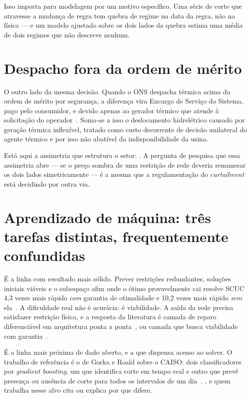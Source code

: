 \documentclass[10pt,a4paper,oneside]{book}
\begin{document}
Isso importa para modelagem por um motivo específico.  Uma série de corte que atravesse a mudança de
regra tem quebra de regime na data da regra, não na física --- e um modelo
ajustado sobre os dois lados da quebra estima uma média de dois regimes que não
descreve nenhum.

\section*{Despacho fora da ordem de mérito}

O outro lado da mesma decisão. Quando o ONS despacha térmica acima da ordem de
mérito por segurança, a diferença vira Encargo de Serviço do Sistema, pago pelo
consumidor, e devido apenas ao gerador térmico que atende à solicitação do
operador~\cite{ess}. Soma-se a isso o deslocamento hidrelétrico causado por
geração térmica inflexível, tratado como custo decorrente de decisão unilateral
do agente térmico e por isso não abatível da indisponibilidade da usina.

Está aqui a assimetria que estrutura o setor: . A pergunta de pesquisa que essa
assimetria abre --- se o preço sombra de uma restrição de rede deveria remunerar
os dois lados simetricamente --- é a mesma que a regulamentação do
\emph{curtailment} está decidindo por outra via.

\section*{Aprendizado de máquina: três tarefas distintas, frequentemente confundidas}

É a linha com resultado mais sólido. Prever restrições redundantes, soluções
iniciais viáveis e o subespaço afim onde o ótimo provavelmente cai resolve SCUC
4,3 vezes mais rápido \emph{com} garantia de otimalidade e 10,2 vezes mais
rápido \emph{sem} ela~\cite{xavier2020}. A dificuldade real não é acurácia: é
viabilidade. A saída da rede precisa satisfazer restrição física, e a resposta
da literatura é camada de reparo diferenciável em arquitetura ponta a
ponta~\cite{chen2024}, ou camada que busca viabilidade com
garantia~\cite{nguyen2025}.

É a linha mais próxima de dado aberto, e a que dispensa acesso ao solver. O
trabalho de referência é o de Gorka e Roald sobre o CAISO: dois classificadores
por \emph{gradient boosting}, um que identifica corte em tempo real e outro que
prevê presença ou ausência de corte para todos os intervalos de um
dia~\cite{gorka2024}. , e quem trabalha nesse alvo cita ou
explica por que difere.
\end{document}
